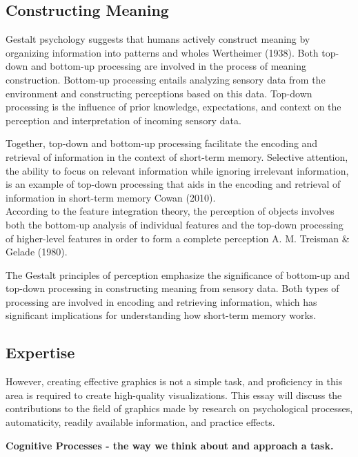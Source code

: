 \documentclass[print]{nuthesis}
\begin{document}
\hypertarget{constructing-meaning}{%
\subsection{Constructing Meaning}\label{constructing-meaning}}

Gestalt psychology suggests that humans actively construct meaning by organizing information into patterns and wholes Wertheimer (1938).
Both top-down and bottom-up processing are involved in the process of meaning construction.
Bottom-up processing entails analyzing sensory data from the environment and constructing perceptions based on this data.
Top-down processing is the influence of prior knowledge, expectations, and context on the perception and interpretation of incoming sensory data.

Together, top-down and bottom-up processing facilitate the encoding and retrieval of information in the context of short-term memory.
Selective attention, the ability to focus on relevant information while ignoring irrelevant information, is an example of top-down processing that aids in the encoding and retrieval of information in short-term memory Cowan (2010).\\
According to the feature integration theory, the perception of objects involves both the bottom-up analysis of individual features and the top-down processing of higher-level features in order to form a complete perception A. M. Treisman \& Gelade (1980).

The Gestalt principles of perception emphasize the significance of bottom-up and top-down processing in constructing meaning from sensory data.
Both types of processing are involved in encoding and retrieving information, which has significant implications for understanding how short-term memory works.

\hypertarget{expertise}{%
\subsection{Expertise}\label{expertise}}

However, creating effective graphics is not a simple task, and proficiency in this area is required to create high-quality visualizations.
This essay will discuss the contributions to the field of graphics made by research on psychological processes, automaticity, readily available information, and practice effects.

\textbf{Cognitive Processes - the way we think about and approach a task.}
\end{document}
